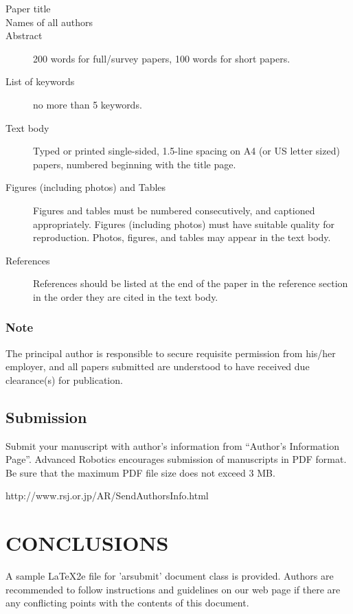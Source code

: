 \documentclass{arsubmit}
\begin{document}
\begin{description}
\item[Paper title]
\item[Names of all authors]
\item[Abstract]
200 words for full/survey papers, 100 words for short papers. 
\item [List of keywords]
no more than 5 keywords. 
\item [Text body]
Typed or printed single-sided, 1.5-line spacing on A4 (or US letter sized) 
papers, numbered beginning with the title page.
\item [Figures (including photos) and Tables]
Figures and tables must be numbered consecutively, and captioned appropriately. 
Figures (including photos) must have suitable quality for reproduction.
Photos, figures, and tables may appear in the text body.
\item [References]
References should be listed at the end of the paper in the reference section in the order they are cited in the text body. 
\end{description}

\subsubsection*{Note}
\label{sec:Note2}
The principal author is responsible to secure requisite permission from 
his/her employer, and all papers submitted are understood to have 
received due clearance(s) for publication.

\subsection{Submission}
\label{sec:Submission}

Submit your manuscript with author's information from 
``Author's Information Page''.
Advanced Robotics encourages submission of manuscripts in PDF format.
Be sure that the maximum PDF file size does not exceed 3 MB.

\begin{center}
http://www.rsj.or.jp/AR/SendAuthorsInfo.html
\end{center}

\section{CONCLUSIONS}
\label{sec:Conclusions}

A sample \LaTeX2e file for 'arsubmit' document class is provided.
Authors are recommended to follow instructions and guidelines on our web
page if there are any conflicting points with the contents of this document.
\end{document}
